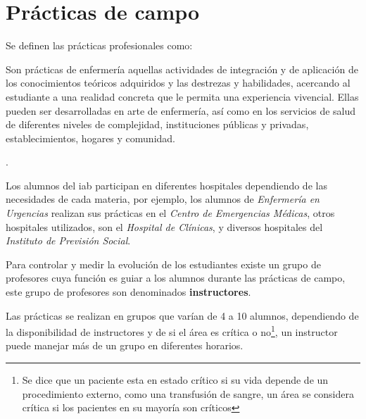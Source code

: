 \section{Prácticas de campo}
\label{sec:practica_hos}

Se definen las prácticas profesionales como\cite{iab:est_enfemeria}:

\begin{displayquote}

Son prácticas de enfermería aquellas actividades de integración y de aplicación
de los conocimientos teóricos adquiridos y las destrezas y habilidades,
acercando al estudiante a una realidad concreta que le permita una experiencia
vivencial. Ellas pueden ser desarrolladas en arte de enfermería, así como en los
servicios de salud de diferentes niveles de complejidad, instituciones públicas
y privadas, establecimientos, hogares y comunidad.

\end{displayquote}

.


Los alumnos del \Gls{iab} participan  en diferentes hospitales dependiendo de las necesidades de cada
materia, por ejemplo, los alumnos de \textit{Enfermería en Urgencias} realizan
sus prácticas en el \textit{Centro de Emergencias Médicas}, otros hospitales
utilizados, son el \textit{Hospital de Clínicas}, y diversos hospitales del
\textit{Instituto de Previsión Social}.


Para controlar y medir la evolución de los estudiantes existe un grupo de
profesores cuya función es guiar a los alumnos durante las prácticas de campo,
este grupo de profesores son denominados \textbf{instructores}.

Las prácticas se realizan en grupos que varían de 4 a 10 alumnos, dependiendo de
la disponibilidad de instructores y de si el área es crítica o no\footnote{Se
    dice que un paciente esta en estado crítico si su vida depende de un
    procedimiento externo, como una transfusión de sangre, un área se considera
    crítica si los pacientes en su mayoría son críticos}, un instructor puede
manejar más de un grupo en diferentes horarios. 

